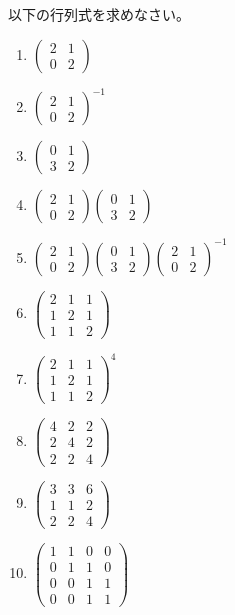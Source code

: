 \documentclass[twocolumn,11pt]{jarticle}
\begin{document}
\exercise
以下の行列式を求めなさい。
  \begin{enumerate}
  \item $\begin{pmatrix}
    2 & 1\\
    0 & 2
  \end{pmatrix}$
  \item $\begin{pmatrix}
    2 & 1\\
    0 & 2
  \end{pmatrix}^{-1}$
  \item $\begin{pmatrix}
    0 & 1\\
    3 & 2
  \end{pmatrix}$
  \item $\begin{pmatrix}
    2 & 1\\
    0 & 2
  \end{pmatrix}
  \begin{pmatrix}
    0 & 1\\
    3 & 2
  \end{pmatrix}$
  \item $\begin{pmatrix}
    2 & 1\\
    0 & 2
  \end{pmatrix}
  \begin{pmatrix}
    0 & 1\\
    3 & 2
  \end{pmatrix}
  \begin{pmatrix}
    2 & 1\\
    0 & 2
  \end{pmatrix}^{-1}$
  \item $\begin{pmatrix}
    2 & 1 & 1\\
    1 & 2 & 1\\
    1 & 1 & 2
  \end{pmatrix}$
  \item $\begin{pmatrix}
    2 & 1 & 1\\
    1 & 2 & 1\\
    1 & 1 & 2
  \end{pmatrix}^4$
  \item $\begin{pmatrix}
    4 & 2 & 2\\
    2 & 4 & 2\\
    2 & 2 & 4
  \end{pmatrix}$
  \item $\begin{pmatrix}
    3 & 3 & 6\\
    1 & 1 & 2\\
    2 & 2 & 4
  \end{pmatrix}$
  \item $\begin{pmatrix}
    1 & 1 & 0 & 0\\
    0 & 1 & 1 & 0\\
    0 & 0 & 1 & 1 \\
    0 & 0 & 1 & 1
  \end{pmatrix}$
  \end{enumerate}
\end{document}

